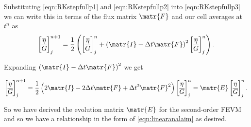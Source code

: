 Substituting \eqref{eqn:RKstepfullp1} and \eqref{eqn:RKstepfullp2} into \eqref{eqn:RKstepfullp3} we can write this in terms of the flux matrix $\matr{F}$ and our cell averages at $t^n$ as
\begin{equation*}
\begin{bmatrix}
\overline{\eta} \\ \overline{G}
\end{bmatrix}^{n+1}_j = \frac{1}{2} \left(\begin{bmatrix}
\overline{\eta} \\ \overline{G}
\end{bmatrix}^{n}_j + \left(\matr{I} - \Delta t\matr{F} \right)^2 \begin{bmatrix}
\overline{\eta} \\ \overline{G}
\end{bmatrix}^{n}_j\right).
\end{equation*}

Expanding $\left(\matr{I} - \Delta t\matr{F} \right)^2$ we get

\begin{equation}
\label{eqn:FullyExpandedF}
\begin{bmatrix}
\overline{\eta} \\ \overline{G}
\end{bmatrix}^{n+1}_j = \frac{1}{2} \left(2\matr{I}  -2\Delta t\matr{F} + \Delta t^2\matr{F}^2 \right) \begin{bmatrix}
\overline{\eta} \\ \overline{G}
\end{bmatrix}^{n}_j = \matr{E}\begin{bmatrix}
\overline{\eta} \\ \overline{G}
\end{bmatrix}^{n}_j.
\end{equation}

So we have derived the evolution matrix $\matr{E}$ for the second-order FEVM and so we have a relationship in the form of \eqref{eqn:linearanalaim} as desired.
 

